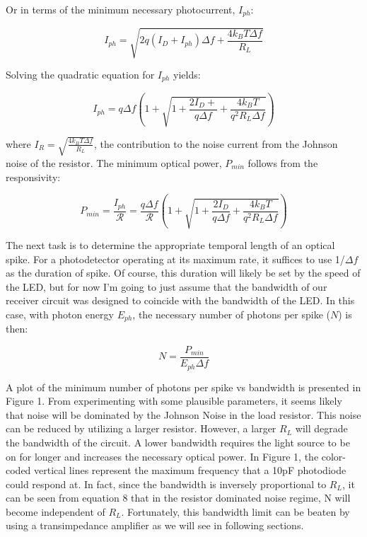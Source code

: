 \documentclass[12pt]{article}
\begin{document}
Or in terms of the minimum necessary photocurrent, $I_{ph}$:

\begin{equation}
    I_{ph} = \sqrt{2q(I_D+I_{ph})\Delta f + \frac{4k_{B}T\Delta f}{R_{L}}
    }
\end{equation}

Solving the quadratic equation for $I_{ph}$ yields:

\begin{equation}
    I_{ph} = q\Delta f(1+\sqrt{1+\frac{2I_D+}{q\Delta f} +
    \frac{4k_BT}{q^2R_L\Delta f}})
\end{equation}

where $I_R = \sqrt{\frac{4k_{B}T\Delta f}{R_{L}}}$, the contribution to the noise current from the Johnson noise of the resistor. The minimum optical power, $P_{min}$ follows from the responsivity:

\begin{equation}
    P_{min} = \frac{I_{ph}}{\mathcal{R}}=
    \frac{q\Delta f}{\mathcal{R}}(1+\sqrt{1+\frac{2I_D}{q\Delta f} +
    \frac{4k_BT}{q^2R_L\Delta f}})
\end{equation}

The next task is to determine the appropriate temporal length of an optical spike. For a photodetector operating at its maximum rate, it suffices to use 1/$\Delta f$ as the duration of spike. Of course, this duration will likely be set by the speed of the LED, but for now I'm going to just assume that the bandwidth of our receiver circuit was designed to coincide with the bandwidth of the LED. In this case, with photon energy $E_{ph}$, the necessary number of photons per spike ($N$) is then:

\begin{equation}
    N = \frac{P_{min}}{E_{ph}\Delta f}
\end{equation}


A plot of the minimum number of photons per spike vs bandwidth is presented in Figure 1. From experimenting with some plausible parameters, it seems likely that noise will be dominated by the Johnson Noise in the load resistor. This noise can be reduced by utilizing a larger resistor. However, a larger $R_L$ will degrade the bandwidth of the circuit. A lower bandwidth requires the light source to be on for longer and increases the necessary optical power. In Figure 1, the color-coded vertical lines represent the maximum frequency that a 10pF photodiode could respond at. In fact, since the bandwidth is inversely proportional to $R_L$, it can be seen from equation 8 that in the resistor dominated noise regime, N will become independent of $R_L$. Fortunately, this bandwidth limit can be beaten by using a transimpedance amplifier as we will see in following sections.
\end{document}
